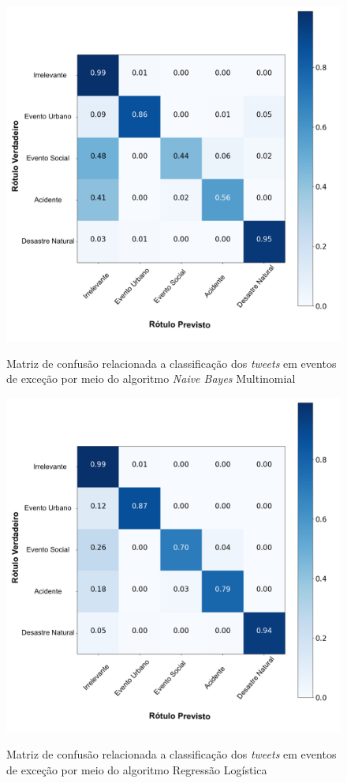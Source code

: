 \documentclass[
	12pt,				%
	oneside,			%
	a4paper,			%
	english,			%
	brazil				%
	]{abntex2ppgsi}
\begin{document}
{{{\begin{apendicesenv}
\begin{figure}[!htb]
	\centering
 	  \caption{Matriz de confusão relacionada a classificação dos \textit{tweets} em eventos de exceção por meio do algoritmo \textit{Naive Bayes} Multinomial}
		\includegraphics[width=1\linewidth]{images/confusion_matrix_mnb_pt.png}
	\label{fig:confusion_matrix_mnb}
\end{figure}

\begin{figure}[!htb]
	\centering
 	  \caption{Matriz de confusão relacionada a classificação dos \textit{tweets} em eventos de exceção por meio do algoritmo Regressão Logística}
		\includegraphics[width=1\linewidth]{images/confusion_matrix_lr_pt.png}
	\label{fig:confusion_matrix_rl}
\end{figure}


\end{apendicesenv}}}}
\end{document}
